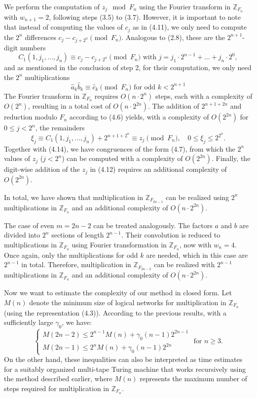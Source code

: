 \documentclass{article}
\begin{document}
We perform the computation of $z_j \mod F_n$ using the Fourier transform in $\mathbb{Z}_{F_n}$ with $w_{n + 1} = 2$, following steps (3.5) to (3.7). However, it is important to note that instead of computing the values of $c_j$ as in (4.11), we only need to compute the $2^n$ differences $c_j - c_{j + 2^n} \pmod{F_n}$. Analogous to (2.8), these are the $2^{n + 1}$-digit numbers
\[
C_1(1, j_1, \ldots, j_n) \equiv c_j - c_{j + 2^n} \pmod{F_n}\text{ with }j = j_1 \cdot 2^{n - 1} + \ldots + j_n \cdot 2^0,
\]
and as mentioned in the conclusion of step 2, for their computation, we only need the $2^n$ multiplications
\[
\hat{a}_k \hat{b}_k \equiv \hat{c}_k \pmod{F_n}\text{ for odd }k < 2^{n + 1}
\]
The Fourier transform in $\mathbb{Z}_{F_n}$ requires $O(n \cdot 2^n)$ steps, each with a complexity of $O(2^n)$, resulting in a total cost of $O(n \cdot 2^{2n})$. The addition of $2^{n + 1 + 2n}$ and reduction modulo $F_n$ according to (4.6) yields, with a complexity of $O(2^{2n})$ for $0 \le j < 2^n$, the remainders
\[
\xi_j \equiv C_1(1, j_1, \ldots, j_n) + 2^{n + 1 + 2^n} \equiv z_j \pmod{F_n}, \quad 0 \le \xi_j \le 2^{2^n}.
\]
Together with (4.14), we have congruences of the form (4.7), from which the $2^n$ values of $z_j$ ($j < 2^n$) can be computed with a complexity of $O(2^{2n})$. Finally, the digit-wise addition of the $z_j$ in (4.12) requires an additional complexity of $O(2^{2n})$.

In total, we have shown that multiplication in $\mathbb{Z}_{F_{2n - 1}}$ can be realized using $2^n$ multiplications in $\mathbb{Z}_{F_n}$ and an additional complexity of $O(n \cdot 2^{2n})$.

The case of even $m = 2n - 2$ can be treated analogously. The factors $a$ and $b$ are divided into $2^n$ sections of length $2^{n - 1}$. Their convolution is reduced to multiplications in $\mathbb{Z}_{F_n}$ using Fourier transformation in $\mathbb{Z}_{F_n}$, now with $w_n = 4$. Once again, only the multiplications for odd $k$ are needed, which in this case are $2^{n - 1}$ in total. Therefore, multiplication in $\mathbb{Z}_{F_{2n - 2}}$ can be realized with $2^{n - 1}$ multiplications in $\mathbb{Z}_{F_n}$ and an additional complexity of $O(n \cdot 2^{2n})$.

Now we want to estimate the complexity of our method in closed form. Let $M(n)$ denote the minimum size of logical networks for multiplication in $\mathbb{Z}_{F_n}$ (using the representation (4.3)). According to the previous results, with a sufficiently large $\gamma_0$, we have:
\[
\tag{4.15}
\begin{cases}
M(2n - 2) \le 2^{n - 1} M(n) + \gamma_0 (n - 1) 2^{2n - 1} \\
M (2n - 1) \le 2^n M(n) + \gamma_0 (n - 1) 2^{2n}
\end{cases} \text{ for } n \ge 3.
\]
On the other hand, these inequalities can also be interpreted as time estimates for a suitably organized multi-tape Turing machine that works recursively using the method described earlier, where $M(n)$ represents the maximum number of steps required for multiplication in $\mathbb{Z}_{F_n}$.
\end{document}
